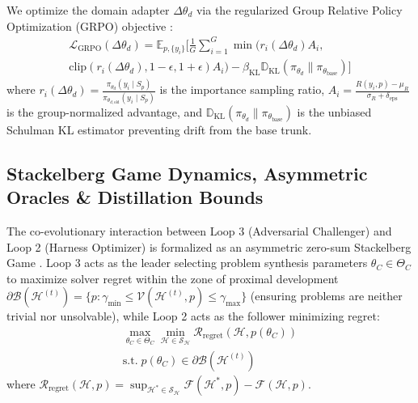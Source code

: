 \documentclass[10pt,twocolumn,letterpaper]{article}
\begin{document}
We optimize the domain adapter $\Delta\theta_{d}$ via the regularized Group Relative Policy Optimization (GRPO) objective \cite{shao2024}:
\begin{multline}
\mathcal{L}_{\text{GRPO}}(\Delta\theta_{d}) = \mathbb{E}_{p,\{y_{i}\}}\Bigg[\frac{1}{G}\sum_{i=1}^{G}\min\!\Big(r_{i}(\Delta\theta_{d})A_{i}, \\
\text{clip}\!\left(r_{i}(\Delta\theta_{d}),1-\epsilon,1+\epsilon\right)A_{i}\Big) - \beta_{\text{KL}}\mathbb{D}_{\text{KL}}\!\left(\pi_{\theta_{d}}\parallel\pi_{\theta_{\text{base}}}\right)\Bigg]
\end{multline}
where $r_{i}(\Delta\theta_{d})=\frac{\pi_{\theta_{d}}(y_{i}\mid S_{p})}{\pi_{\theta_{d,\text{old}}}(y_{i}\mid S_{p})}$ is the importance sampling ratio, $A_{i}=\frac{R(y_{i},p)-\mu_{R}}{\sigma_{R}+\delta_{\text{eps}}}$ is the group-normalized advantage, and $\mathbb{D}_{\text{KL}}(\pi_{\theta_{d}}\parallel\pi_{\theta_{\text{base}}})$ is the unbiased Schulman KL estimator preventing drift from the base trunk.

\subsection{Stackelberg Game Dynamics, Asymmetric Oracles \& Distillation Bounds}
The co-evolutionary interaction between Loop 3 (Adversarial Challenger) and Loop 2 (Harness Optimizer) is formalized as an asymmetric zero-sum Stackelberg Game \cite{stackelberg1934,dennis2020}. Loop 3 acts as the leader selecting problem synthesis parameters $\theta_{C}\in\Theta_{C}$ to maximize solver regret within the zone of proximal development $\partial\mathcal{B}(\mathcal{H}^{(t)})=\{p : \gamma_{\min}\le\mathcal{V}(\mathcal{H}^{(t)},p)\le\gamma_{\max}\}$ (ensuring problems are neither trivial nor unsolvable), while Loop 2 acts as the follower minimizing regret:
\begin{multline}
\max_{\theta_{C}\in\Theta_{C}}\min_{\mathcal{H}\in\mathcal{S}_{\mathcal{H}}}\mathcal{R}_{\text{regret}}\!\left(\mathcal{H},p(\theta_{C})\right) \\
\text{s.t.}\; p(\theta_{C})\in\partial\mathcal{B}\!\left(\mathcal{H}^{(t)}\right)
\end{multline}
where $\mathcal{R}_{\text{regret}}(\mathcal{H},p)=\sup_{\mathcal{H}^{*}\in\mathcal{S}_{\mathcal{H}}}\mathcal{F}(\mathcal{H}^{*},p)-\mathcal{F}(\mathcal{H},p)$.
\end{document}
